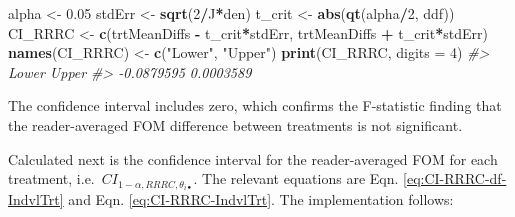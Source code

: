 \documentclass[
]{book}
\newenvironment{Shaded}{\begin{snugshade}}{\end{snugshade}}
\newcommand{\CommentTok}[1]{\textcolor[rgb]{0.56,0.35,0.01}{\textit{#1}}}
\newcommand{\DataTypeTok}[1]{\textcolor[rgb]{0.13,0.29,0.53}{#1}}
\newcommand{\DecValTok}[1]{\textcolor[rgb]{0.00,0.00,0.81}{#1}}
\newcommand{\FloatTok}[1]{\textcolor[rgb]{0.00,0.00,0.81}{#1}}
\newcommand{\KeywordTok}[1]{\textcolor[rgb]{0.13,0.29,0.53}{\textbf{#1}}}
\newcommand{\NormalTok}[1]{#1}
\newcommand{\OperatorTok}[1]{\textcolor[rgb]{0.81,0.36,0.00}{\textbf{#1}}}
\newcommand{\StringTok}[1]{\textcolor[rgb]{0.31,0.60,0.02}{#1}}
\begin{document}
\begin{Shaded}
\begin{Highlighting}[]
\NormalTok{alpha <-}\StringTok{ }\FloatTok{0.05}
\NormalTok{stdErr <-}\StringTok{ }\KeywordTok{sqrt}\NormalTok{(}\DecValTok{2}\OperatorTok{/}\NormalTok{J}\OperatorTok{*}\NormalTok{den)}
\NormalTok{t_crit <-}\StringTok{ }\KeywordTok{abs}\NormalTok{(}\KeywordTok{qt}\NormalTok{(alpha}\OperatorTok{/}\DecValTok{2}\NormalTok{, ddf))}
\NormalTok{CI_RRRC <-}\StringTok{ }\KeywordTok{c}\NormalTok{(trtMeanDiffs }\OperatorTok{-}\StringTok{ }\NormalTok{t_crit}\OperatorTok{*}\NormalTok{stdErr, }
\NormalTok{             trtMeanDiffs }\OperatorTok{+}\StringTok{ }\NormalTok{t_crit}\OperatorTok{*}\NormalTok{stdErr)}
\KeywordTok{names}\NormalTok{(CI_RRRC) <-}\StringTok{ }\KeywordTok{c}\NormalTok{(}\StringTok{"Lower"}\NormalTok{, }\StringTok{"Upper"}\NormalTok{)}
\KeywordTok{print}\NormalTok{(CI_RRRC, }\DataTypeTok{digits =} \DecValTok{4}\NormalTok{)}
\CommentTok{#>      Lower      Upper }
\CommentTok{#> -0.0879595  0.0003589}
\end{Highlighting}
\end{Shaded}

The confidence interval includes zero, which confirms the F-statistic finding that the reader-averaged FOM difference between treatments is not significant.

Calculated next is the confidence interval for the reader-averaged FOM for each treatment, i.e.~\(CI_{1-\alpha,RRRC,\theta_{i \bullet}}\). The relevant equations are Eqn. \eqref{eq:CI-RRRC-df-IndvlTrt} and Eqn. \eqref{eq:CI-RRRC-IndvlTrt}. The implementation follows:
\end{document}
